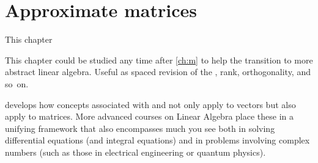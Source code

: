 
\chapter{Approximate matrices}
\label{ch:am}

\minitoc



This chapter 
\begin{aside}
This chapter could be studied any time after \autoref{ch:m} to help the transition to more abstract linear algebra.  
Useful as spaced revision of the \svd, rank, orthogonality, and so~on.
\end{aside}%
develops how concepts associated with  and  not only apply to vectors but also apply to matrices.  
More advanced courses on Linear Algebra place these in a unifying framework that also encompasses much you see both in solving differential equations (and integral equations) and in problems involving complex numbers (such as those in electrical engineering or quantum physics). 



\begin{comment} 
Huge applications of \svd{}s to video compression, experimental errors, and other areas.
Introduce digital \idx{image compression} by \svd{}s \pooliv{p.607--8} \holti{p.336--7}  \cite[\S07]{Davis99a}.
\cite{Higham86} mentions applications of \idx{polar decomposition} to the Orthogonal Procrustes problem.
\end{comment}







\endinput

